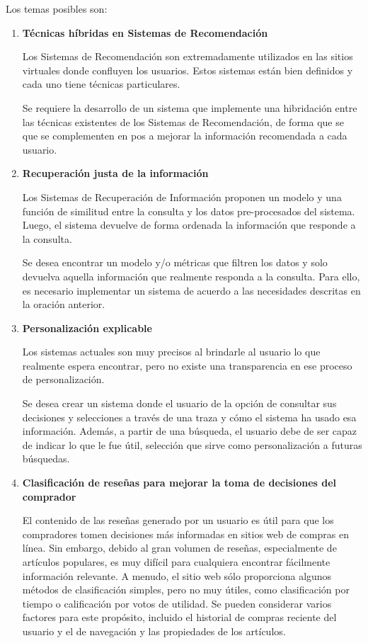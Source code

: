 \documentclass[10pt]{article}
\begin{document}
		Los temas posibles son:
		\begin{enumerate}
			
			\item \textbf{Técnicas híbridas en Sistemas de Recomendación} 
			
			Los Sistemas de Recomendación son extremadamente utilizados en las sitios virtuales donde confluyen los usuarios. Estos sistemas están bien definidos y cada uno tiene técnicas particulares. 
			
			Se requiere la desarrollo de un sistema que implemente una hibridación entre las técnicas existentes de los Sistemas de Recomendación, de forma que se que se complementen en pos a mejorar la información recomendada a cada usuario. 
			
			\item \textbf{Recuperación justa de la información} 
			
			Los Sistemas de Recuperación de Información proponen un modelo y una función de similitud entre la consulta y los datos pre-procesados del sistema. Luego, el sistema devuelve de forma ordenada la información que responde a la consulta. 
			
			Se desea encontrar un modelo y/o métricas que filtren los datos y solo devuelva aquella información que realmente responda a la consulta. Para ello, es necesario implementar un sistema de acuerdo a las necesidades descritas en la oración anterior.
			
			\item \textbf{Personalización explicable} 
			
			Los sistemas actuales son muy precisos al brindarle al usuario lo que realmente espera encontrar, pero no existe una transparencia en ese proceso de personalización. 
			
			Se desea crear un sistema donde el usuario de la opción de consultar sus decisiones y selecciones a través de una traza y cómo el sistema ha usado esa información. Además, a partir de una búsqueda, el usuario debe de ser capaz de indicar lo que le fue útil, selección que sirve como personalización a futuras búsquedas.
			
			\item \textbf{Clasificación de reseñas para mejorar la toma de decisiones del comprador} 
			
			El contenido de las reseñas generado por un usuario es útil para que los compradores tomen decisiones más informadas en sitios web de compras en línea. Sin embargo, debido al gran volumen de reseñas, especialmente de artículos populares, es muy difícil para cualquiera encontrar fácilmente información relevante. A menudo, el sitio web sólo proporciona algunos métodos de clasificación simples, pero no muy útiles, como clasificación por tiempo o calificación por votos de utilidad. Se pueden considerar varios factores para este propósito, incluido el historial de compras reciente del usuario y el de navegación y las propiedades de los artículos. 
			

\end{enumerate}
\end{document}
